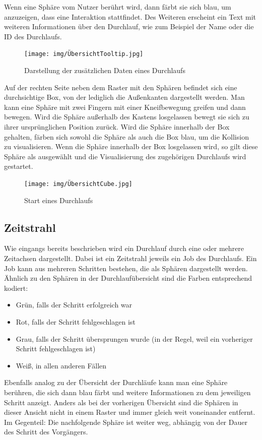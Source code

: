 \documentclass[a4paper]{article}
\begin{document}
Wenn eine Sphäre vom Nutzer berührt wird, dann färbt sie sich blau, um anzuzeigen, dass eine Interaktion stattfindet. Des Weiteren erscheint ein Text mit weiteren Informationen über den Durchlauf, wie zum Beispiel der Name oder die ID des Durchlaufs.

\begin{figure}[H]
    \centering
    \texttt{[image: img/ÜbersichtTooltip.jpg]}
    \caption{Darstellung der zusätzlichen Daten eines Durchlaufs}
    \label{fig:Tooltip}
\end{figure}

Auf der rechten Seite neben dem Raster mit den Sphären befindet sich eine durchsichtige Box, von der lediglich die Außenkanten dargestellt werden. Man kann eine Sphäre mit zwei Fingern mit einer Kneifbewegung greifen und dann bewegen. Wird die Sphäre außerhalb des Kastens losgelassen bewegt sie sich zu ihrer ursprünglichen Position zurück. Wird die Sphäre innerhalb der Box gehalten, färben sich sowohl die Sphäre als auch die Box blau, um die Kollision zu visualisieren. Wenn die Sphäre innerhalb der Box losgelassen wird, so gilt diese Sphäre als ausgewählt und die Visualisierung des zugehörigen Durchlaufs wird gestartet.

\begin{figure}[H]
    \centering
    \texttt{[image: img/ÜbersichtCube.jpg]}
    \caption{Start eines Durchlaufs}
    \label{fig:Cube}
\end{figure}

\subsection{Zeitstrahl}
\label{subsec:Timeline}
Wie eingangs bereits beschrieben wird ein Durchlauf durch eine oder mehrere Zeitachsen dargestellt. Dabei ist ein Zeitstrahl jeweils ein Job des Durchlaufs. Ein Job kann aus mehreren Schritten bestehen, die als Sphären dargestellt werden. Ähnlich zu den Sphären in der Durchlaufübersicht sind die Farben entsprechend kodiert:
\begin{itemize}
    \item Grün, falls der Schritt erfolgreich war
    \item Rot, falls der Schritt fehlgeschlagen ist
    \item Grau, falls der Schritt übersprungen wurde (in der Regel, weil ein vorheriger Schritt fehlgeschlagen ist)
    \item Weiß, in allen anderen Fällen
\end{itemize}
Ebenfalls analog zu der Übersicht der Durchläufe kann man eine Sphäre berühren, die sich dann blau färbt und weitere Informationen zu dem jeweiligen Schritt anzeigt. Anders als bei der vorherigen Übersicht sind die Sphären in dieser Ansicht nicht in einem Raster und immer gleich weit voneinander entfernt. Im Gegenteil: Die nachfolgende Sphäre ist weiter weg, abhängig von der Dauer des Schritt des Vorgängers.
\end{document}
